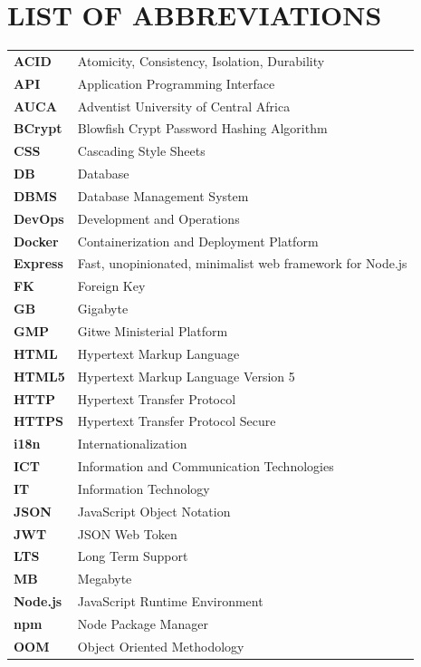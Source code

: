 \documentclass[12pt]{report}
\begin{document}
\chapter*{LIST OF ABBREVIATIONS}
\begin{longtable}{L{3cm} L{12cm}}
\textbf{ACID} & Atomicity, Consistency, Isolation, Durability \\
\textbf{API} & Application Programming Interface \\
\textbf{AUCA} & Adventist University of Central Africa \\
\textbf{BCrypt} & Blowfish Crypt Password Hashing Algorithm \\
\textbf{CSS} & Cascading Style Sheets \\
\textbf{DB} & Database \\
\textbf{DBMS} & Database Management System \\
\textbf{DevOps} & Development and Operations \\
\textbf{Docker} & Containerization and Deployment Platform \\
\textbf{Express} & Fast, unopinionated, minimalist web framework for Node.js \\
\textbf{FK} & Foreign Key \\
\textbf{GB} & Gigabyte \\
\textbf{GMP} & Gitwe Ministerial Platform \\
\textbf{HTML} & Hypertext Markup Language \\
\textbf{HTML5} & Hypertext Markup Language Version 5 \\
\textbf{HTTP} & Hypertext Transfer Protocol \\
\textbf{HTTPS} & Hypertext Transfer Protocol Secure \\
\textbf{i18n} & Internationalization \\
\textbf{ICT} & Information and Communication Technologies \\
\textbf{IT} & Information Technology \\
\textbf{JSON} & JavaScript Object Notation \\
\textbf{JWT} & JSON Web Token \\
\textbf{LTS} & Long Term Support \\
\textbf{MB} & Megabyte \\
\textbf{Node.js} & JavaScript Runtime Environment \\
\textbf{npm} & Node Package Manager \\
\textbf{OOM} & Object Oriented Methodology \\

\end{longtable}
\end{document}
